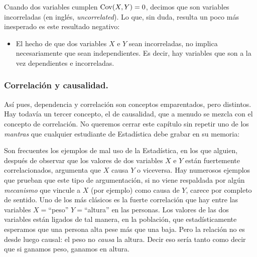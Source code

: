 Cuando dos variables cumplen $\mathrm{Cov}(X,Y)=0$, decimos que son {\sf variables incorreladas} (en inglés, {\em uncorrelated}).  Lo que, sin duda, resulta un poco más inesperado es este resultado negativo:

\begin{itemize}
 \item El hecho de que dos variables $X$ e $Y$ sean incorreladas, no implica necesariamente que sean independientes. Es decir, hay variables que son a la vez dependientes e incorreladas.
\end{itemize}

\subsubsection*{Correlación y causalidad.}
\label{cap10:subsubsec:CorrelacionVsCausalidad}

Así pues, dependencia y correlación son conceptos emparentados, pero distintos. Hay todavía un tercer concepto, el de {\sf causalidad}, que a menudo se mezcla con el concepto de correlación. No queremos cerrar este capítulo sin repetir uno de los {\em mantras} que cualquier estudiante de Estadística debe grabar en su memoria:

    \begin{center}
    \end{center}

Son frecuentes los ejemplos de mal uso de la Estadística, en los que alguien, después de observar que los valores de dos variables $X$ e $Y$ están fuertemente correlacionados, argumenta que $X$ causa $Y$ o viceversa. Hay numerosos ejemplos que prueban que este tipo de argumentación, si no viene respaldada por algún {\em mecanismo} que vincule a $X$ (por ejemplo) como causa de $Y$, carece por completo de sentido. Uno de los más clásicos es la fuerte correlación que hay entre las variables $X=$``peso''  $Y=$``altura'' en las personas. Los valores de las dos variables están ligados de tal manera, en la población, que estadísticamente esperamos que una persona alta pese más que una baja. Pero la relación no es desde luego causal: el peso no {\em causa} la altura. Decir eso sería tanto como decir que si ganamos peso, ganamos en altura.


